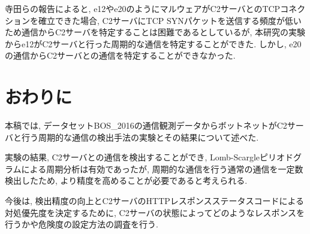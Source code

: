 \documentclass[twocolumn,9pt]{ltjsarticle}
\begin{document}
寺田らの報告によると, e12やe20のようにマルウェアがC2サーバとのTCPコネクションを確立できた場合, C2サーバにTCP SYNパケットを送信する頻度が低いため通信からC2サーバを特定することは困難であるとしているが, 本研究の実験からe12がC2サーバと行った周期的な通信を特定することができた. しかし, e20の通信からC2サーバとの通信を特定することができなかった. 

\section{おわりに}
本稿では, データセットBOS\_2016の通信観測データからボットネットがC2サーバと行う周期的な通信の検出手法の実験とその結果について述べた. 

実験の結果, C2サーバとの通信を検出することができ, Lomb-Scargleピリオドグラムによる周期分析は有効であったが, 周期的な通信を行う通常の通信を一定数検出したため, より精度を高めることが必要であると考えられる. 

今後は, 検出精度の向上とC2サーバのHTTPレスポンスステータスコードによる対処優先度を決定するために, C2サーバの状態によってどのようなレスポンスを行うかや危険度の設定方法の調査を行う. 



\end{document}
